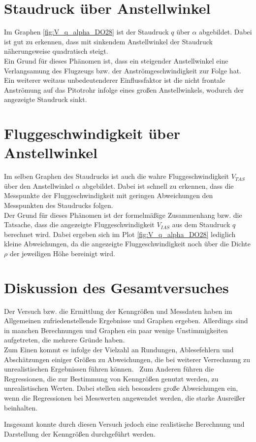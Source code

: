 \section{Staudruck über Anstellwinkel}

Im Graphen \ref{fig:V_q_alpha_DO28} ist der Staudruck $q$ über $\alpha$ abgebildet. Dabei ist gut zu erkennen, dass mit sinkendem Anstellwinkel der Staudruck näherungsweise quadratisch steigt. \\
Ein Grund für dieses Phänomen ist, dass ein steigender Anstellwinkel eine Verlangsamung des Flugzeugs bzw. der Anströmgeschwindigkeit zur Folge hat. \\ Ein weiterer weitaus unbedeutenderer Einflussfaktor ist die nicht frontale Anströmung auf das Pitotrohr infolge eines großen Anstellwinkels, wodurch der angezeigte Staudruck sinkt.

\section{Fluggeschwindigkeit über Anstellwinkel}

Im selben Graphen des Staudrucks ist auch die wahre Fluggeschwindigkeit $V_{TAS}$ über den Anstellwinkel $\alpha$ abgebildet. Dabei ist schnell zu erkennen, dass die Messpunkte der Fluggeschwindigkeit mit geringen Abweichungen den Messpunkten des Staudrucks folgen. \\
Der Grund für dieses Phänomen ist der formelmäßige Zusammenhang bzw. die Tatsache, dass die angezeigte Fluggeschwindigkeit $V_{IAS}$ aus dem Staudruck $q$ berechnet wird. Dabei ergeben sich im Plot \ref{fig:V_q_alpha_DO28} lediglich kleine Abweichungen, da die angezeigte Fluggeschwindigkeit noch über die Dichte $\rho$ der jeweiligen Höhe bereinigt wird.

\section{Diskussion des Gesamtversuches}

Der Versuch bzw. die Ermittlung der Kenngrößen und Messdaten haben im Allgemeinen zufriedenstellende Ergebnisse und Graphen ergeben. Allerdings sind in manchen Berechnungen und Graphen ein paar wenige Unstimmigkeiten aufgetreten, die mehrere Gründe haben.\\
Zum Einen kommt es infolge der Vielzahl an Rundungen, Ablesefehlern und Abschätzungen einiger Größen zu Abweichungen, die bei weiterer Verrechnung zu unrealistischen Ergebnissen führen können. \ Zum Anderen führen die Regressionen, die zur Bestimmung von Kenngrößen genutzt werden, zu unrealistischen Werten. Dabei stellen sich besonders große Abweichungen ein, wenn die Regressionen bei Messwerten angewendet werden, die starke Ausreißer beinhalten.

Insgesamt konnte durch diesen Versuch jedoch eine realistische  Berechnung und Darstellung der Kenngrößen durchgeführt werden.